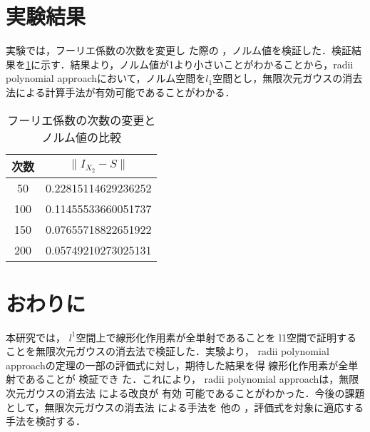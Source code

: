 \documentclass[a4paper,10pt,twocolumn]{jsarticle}
\newcommand{\rad}{radii polynomial approach}
\providecommand{\DIFaddtex}[1]{{\protect\color{blue} \sf #1}} %
\providecommand{\DIFdeltex}[1]{{\protect\color{red} \scriptsize #1}} %
\providecommand{\DIFaddbegin}{} %
\providecommand{\DIFaddend}{} %
\providecommand{\DIFdelbegin}{} %
\providecommand{\DIFdelend}{} %
\providecommand{\DIFadd}[1]{\texorpdfstring{\DIFaddtex{#1}}{#1}} %
\providecommand{\DIFdel}[1]{\texorpdfstring{\DIFdeltex{#1}}{}} %
\newcommand{\DIFscaledelfig}{0.5}
\newlength{\DIFdelgraphicswidth} %
\newlength{\DIFdelgraphicsheight} %
\newcommand{\DIFaddincludegraphics}[2][]{{\color{blue}\fbox{\DIFOincludegraphics[#1]{#2}}}} %
\newcommand{\DIFdelincludegraphics}[2][]{%
\sbox{\DIFdelgraphicsbox}{\DIFOincludegraphics[#1]{#2}}%
\settoboxwidth{\DIFdelgraphicswidth}{\DIFdelgraphicsbox} %
\settoboxtotalheight{\DIFdelgraphicsheight}{\DIFdelgraphicsbox} %
\scalebox{\DIFscaledelfig}{%
\parbox[b]{\DIFdelgraphicswidth}{\usebox{\DIFdelgraphicsbox}\\[-\baselineskip] \rule{\DIFdelgraphicswidth}{0em}}\llap{\resizebox{\DIFdelgraphicswidth}{\DIFdelgraphicsheight}{%
\setlength{\unitlength}{\DIFdelgraphicswidth}%
\begin{picture}(1,1)%
\thicklines\linethickness{2pt} %
{\color[rgb]{1,0,0}\put(0,0){\framebox(1,1){}}}%
{\color[rgb]{1,0,0}\put(0,0){\line( 1,1){1}}}%
{\color[rgb]{1,0,0}\put(0,1){\line(1,-1){1}}}%
\end{picture}%
}\hspace*{3pt}}} %
} %
\DeclareRobustCommand{\DIFaddbegin}{\DIFOaddbegin \let\includegraphics\DIFaddincludegraphics} %
\DeclareRobustCommand{\DIFaddend}{\DIFOaddend \let\includegraphics\DIFOincludegraphics} %
\DeclareRobustCommand{\DIFdelbegin}{\DIFOdelbegin \let\includegraphics\DIFdelincludegraphics} %
\DeclareRobustCommand{\DIFdelend}{\DIFOaddend \let\includegraphics\DIFOincludegraphics} %
\begin{document}
\section{実験結果}
\vspace{-1mm}
実験では，フーリエ係数の次数を変更し\DIFdelbegin \DIFdel{た際の}\DIFdelend \DIFaddbegin \DIFadd{，}\DIFaddend ノルム値を検証した．検証結果を\cref{tab:norm-num}に示す．結果より，ノルム値が1より小さいことがわかることから，\rad{}において，ノルム空間を$l_1$空間とし，無限次元ガウスの消去法による計算手法が有効可能であることがわかる．
\begin{table}[htbp]
  \centering
  \caption{フーリエ係数の次数の変更とノルム値の比較}
  \label{tab:norm-num}
  \begin{tabular}{c||c}
    次数 & $\| I_{X_2}-S \|$ \\ \hline
    50 & 0.22815114629236252 \\
    100&0.11455533660051737\\
    150&0.07655718822651922\\
    200&0.05749210273025131
\end{tabular}
\end{table}
\vspace{-1mm}
\section{おわりに}
\vspace{-1mm}
本研究では，\DIFaddbegin \DIFadd{$l^1$空間上で}\DIFaddend 線形化作用素が全単射であることを\DIFdelbegin \DIFdel{l1空間で証明することを}\DIFdelend 無限次元ガウスの消去法で検証した．実験より，\DIFdelbegin \DIFdel{\rad{}の定理の一部の評価式に対し，期待した結果を得}\DIFdelend \DIFaddbegin \DIFadd{線形化作用素が全単射であ}\DIFaddend ることが\DIFaddbegin \DIFadd{検証}\DIFaddend でき\DIFaddbegin \DIFadd{た．これにより}\DIFaddend ，\DIFaddbegin \DIFadd{\rad{}は，}\DIFaddend 無限次元ガウスの消去法\DIFaddbegin \DIFadd{による改良}\DIFaddend が\DIFdelbegin \DIFdel{有効}\DIFdelend \DIFaddbegin \DIFadd{可能}\DIFaddend であることがわかった．今後の課題として，無限次元ガウスの消去法\DIFaddbegin \DIFadd{による手法}\DIFaddend を\DIFdelbegin \DIFdel{他の}\DIFdelend \DIFaddbegin \DIFadd{，}\DIFaddend 評価式を対象に適応する手法を検討する．
\vspace{-1mm}
{\footnotesize

}
\end{document}
